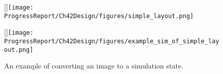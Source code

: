 \begin{figure}[ht]
    \centering

    [\linewidth]{\texttt{[image: ProgressReport/Ch42Design/figures/simple\_layout.png]}
    }
    
    [\linewidth]{\texttt{[image: ProgressReport/Ch42Design/figures/example\_sim\_of\_simple\_layout.png]}
    }
    
    \caption{An example of converting an image to a simulation state.}
    \label{fig:ExampleMakeinput}
\end{figure}